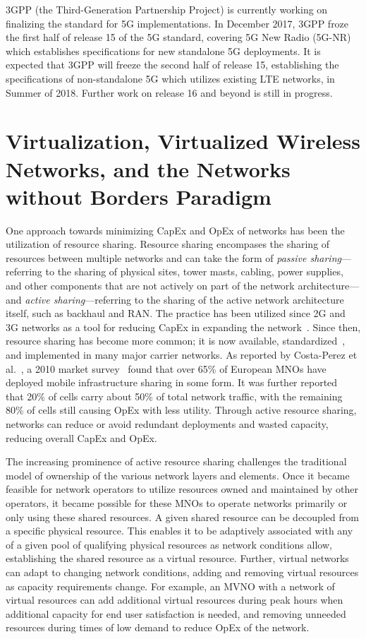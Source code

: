 \documentclass[12pt,dvipsnames]{report}
\begin{document}
3GPP (the Third-Generation Partnership Project) is currently working on finalizing the standard for 5G implementations.  In December 2017, 3GPP froze the first half of release 15 of the 5G standard, covering 5G New Radio (5G-NR) which establishes specifications for new standalone 5G deployments.  It is expected that 3GPP will freeze the second half of release 15, establishing the specifications of non-standalone 5G which utilizes existing LTE networks, in Summer of 2018.  Further work on release 16 and beyond is still in progress.

\section{Virtualization, Virtualized Wireless Networks, and the Networks without Borders Paradigm} \label{sec:virtualization}

One approach towards minimizing CapEx and OpEx of networks has been the utilization of resource sharing.  Resource sharing encompases the sharing of resources between multiple networks and can take the form of \emph{passive sharing}---referring to the sharing of physical sites, tower masts, cabling, power supplies, and other components that are not actively on part of the network architecture---and \emph{active sharing}---referring to the sharing of the active network architecture itself, such as backhaul and RAN.  The practice has been utilized since 2G and 3G networks as a tool for reducing CapEx in expanding the network~\cite{1421931}.  Since then, resource sharing has become more common; it is now available, standardized~\cite{3GPP_TS_23.251}, and implemented in many major carrier networks.  As reported by Costa-Perez et al.~\cite{6553675}, a 2010 market survey~\cite{NetSharingReport} found that over 65\% of European MNOs have deployed mobile infrastructure sharing in some form.  It was further reported~\cite{6553675} that 20\% of cells carry about 50\% of total network traffic, with the remaining 80\% of cells still causing OpEx with less utility.  Through active resource sharing, networks can reduce or avoid redundant deployments and wasted capacity, reducing overall CapEx and OpEx.

The increasing prominence of active resource sharing challenges the traditional model of ownership of the various network layers and elements.  Once it became feasible for network operators to utilize resources owned and maintained by other operators, it became possible for these MNOs to operate networks primarily or only using these shared resources.  A given shared resource can be decoupled from a specific physical resource.  This enables it to be adaptively associated with any of a given pool of qualifying physical resources as network conditions allow, establishing the shared resource as a virtual resource.  Further, virtual networks can adapt to changing network conditions, adding and removing virtual resources as capacity requirements change.  For example, an MVNO with a network of virtual resources can add additional virtual resources during peak hours when additional capacity for end user satisfaction is needed, and removing unneeded resources during times of low demand to reduce OpEx of the network.
\end{document}
